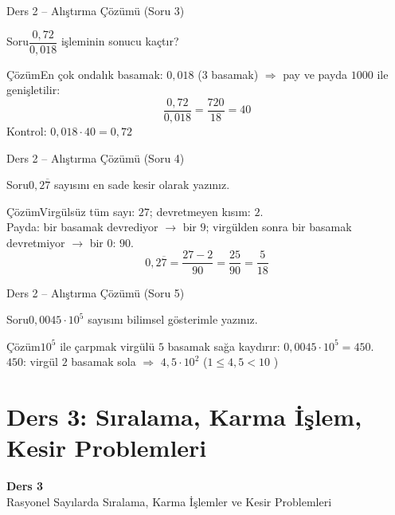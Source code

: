 \documentclass[aspectratio=169,11pt]{beamer}
\newcommand{\soru}[3]{%
\begin{frame}{#1}
  \begin{block}{Soru}\large #2\end{block}
  \pause
  \begin{exampleblock}{Çözüm}\large #3\end{exampleblock}
\end{frame}}
\newcommand{\ab}[1]{\overline{#1}}
\begin{document}
\soru{Ders 2 -- Alıştırma Çözümü (Soru 3)}
{\(\dfrac{0{,}72}{0{,}018}\) işleminin sonucu kaçtır?}
{En çok ondalık basamak: \(0{,}018\) (\(3\) basamak) \(\Rightarrow\) pay ve payda \(1000\) ile genişletilir:
\[\frac{0{,}72}{0{,}018}=\frac{720}{18}=40\]
Kontrol: \(0{,}018\cdot 40=0{,}72\) \checkmark}

\soru{Ders 2 -- Alıştırma Çözümü (Soru 4)}
{\(0{,}2\ab{7}\) sayısını en sade kesir olarak yazınız.}
{Virgülsüz tüm sayı: \(27\); devretmeyen kısım: \(2\).\\[3pt]
Payda: bir basamak devrediyor \(\to\) bir \(9\); virgülden sonra bir basamak devretmiyor \(\to\) bir \(0\): \(90\).
\[0{,}2\ab{7}=\frac{27-2}{90}=\frac{25}{90}=\frac{5}{18}\]}

\soru{Ders 2 -- Alıştırma Çözümü (Soru 5)}
{\(0{,}0045\cdot 10^{5}\) sayısını bilimsel gösterimle yazınız.}
{\(10^{5}\) ile çarpmak virgülü \(5\) basamak sağa kaydırır: \(0{,}0045\cdot 10^{5}=450\).\\[3pt]
\(450\): virgül \(2\) basamak sola \(\Rightarrow\) \(4{,}5\cdot 10^{2}\) \quad (\(1\le 4{,}5<10\) \checkmark)}

\section{Ders 3: Sıralama, Karma İşlem, Kesir Problemleri}
\begin{frame}
\centering\Large\color{anamavi}\textbf{Ders 3}\\[6pt]\normalsize Rasyonel Sayılarda Sıralama, Karma İşlemler ve Kesir Problemleri
\end{frame}
\end{document}
